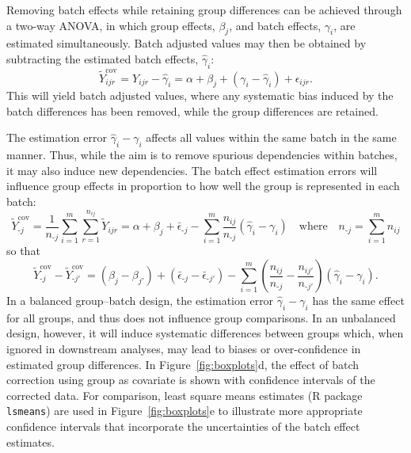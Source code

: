\documentclass{bio}
\begin{document}
Removing batch effects while retaining group differences can be achieved through a two-way ANOVA, in which group effects, $\beta_j$, and batch effects, $\gamma_i$, are estimated simultaneously. Batch adjusted values may then be obtained by subtracting the estimated batch effects, $\hat\gamma_i$:
\begin{equation}
\tilde{Y}^{\textrm{cov}}_{ijr}=Y_{ijr}-\hat\gamma_i=\alpha+\beta_j+(\gamma_i-\hat\gamma_i)+\epsilon_{ijr}.
\end{equation}
This will yield batch adjusted values, where any systematic bias induced by the batch differences has been removed, while the group differences are retained.

The estimation error $\hat\gamma_i-\gamma_i$ affects all values within the same batch in the same manner. Thus, while the aim is to remove spurious dependencies within batches, it may also induce new dependencies. The batch effect estimation errors will influence group effects in proportion to how well the group is represented in each batch:
\begin{equation}
\tilde{Y}^{\textrm{cov}}_{\textrm{-}j}
=\frac{1}{n_{\textrm{-}j}} \sum_{i=1}^m\sum_{r=1}^{n_{ij}}\tilde{Y}_{ijr}
=\alpha+\beta_j+\bar{\epsilon}_{\textrm{-}j}
  -\sum_{i=1}^m \frac{n_{ij}}{n_{\textrm{-}j}}(\hat{\gamma}_i-\gamma_i)
\quad\text{where}\quad
n_{\textrm{-}j}=\sum_{i=1}^m n_{ij}
\end{equation}
so that
\begin{equation}
\tilde{Y}^{\textrm{cov}}_{\textrm{-}j}-\tilde{Y}^{\textrm{cov}}_{\textrm{-}j'}
=(\beta_j-\beta_{j'})+(\bar{\epsilon}_{\textrm{-}j}-\bar{\epsilon}_{\textrm{-}j'})
 -\sum_{i=1}^m \left(\frac{n_{ij}}{n_{\textrm{-}j}}-\frac{n_{ij'}}{n_{\textrm{-}j'}}\right)(\hat{\gamma}_i-\gamma_i).
\end{equation}
In a balanced group--batch design, the estimation error $\hat\gamma_i-\gamma_i$ has the same effect for all groups, and thus does not influence group comparisons. In an unbalanced design, however, it will induce systematic differences between groups which, when ignored in downstream analyses, may lead to biases or over-confidence in estimated group differences. In Figure~\ref{fig:boxplots}d, the effect of batch correction using group as covariate is shown with confidence intervals of the corrected data. For comparison, least square means estimates (R package \texttt{lsmeans}) are used in Figure~\ref{fig:boxplots}e to illustrate more appropriate confidence intervals that incorporate the uncertainties of the batch effect estimates.
\end{document}
